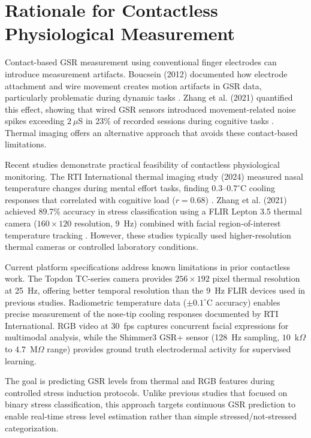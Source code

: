 \documentclass{report}
\begin{document}
    \section{Rationale for Contactless Physiological Measurement}
    \label{sec:rationale_contactless}

    Contact-based GSR measurement using conventional finger electrodes can introduce measurement artifacts. Boucsein (2012) documented how electrode attachment and wire movement creates motion artifacts in GSR data, particularly problematic during dynamic tasks \cite{boucsein2012}. Zhang et al. (2021) quantified this effect, showing that wired GSR sensors introduced movement-related noise spikes exceeding $2~\mu$S in 23\% of recorded sessions during cognitive tasks \cite{zhang2021}. Thermal imaging offers an alternative approach that avoids these contact-based limitations.

    Recent studies demonstrate practical feasibility of contactless physiological monitoring. The RTI International thermal imaging study (2024) measured nasal temperature changes during mental effort tasks, finding $0.3$--$0.7^{\circ}$C cooling responses that correlated with cognitive load ($r = 0.68$) \cite{rti2024}. Zhang et al. (2021) achieved 89.7\% accuracy in stress classification using a FLIR Lepton 3.5 thermal camera ($160 \times 120$ resolution, 9~Hz) combined with facial region-of-interest temperature tracking \cite{zhang2021}. However, these studies typically used higher-resolution thermal cameras or controlled laboratory conditions.

    Current platform specifications address known limitations in prior contactless work. The Topdon TC-series camera provides $256 \times 192$ pixel thermal resolution at 25~Hz, offering better temporal resolution than the 9~Hz FLIR devices used in previous studies. Radiometric temperature data ($\pm 0.1^{\circ}$C accuracy) enables precise measurement of the nose-tip cooling responses documented by RTI International. RGB video at 30~fps captures concurrent facial expressions for multimodal analysis, while the Shimmer3 GSR+ sensor (128~Hz sampling, $10$~k$\Omega$ to $4.7$~M$\Omega$ range) provides ground truth electrodermal activity for supervised learning.

    The goal is predicting GSR levels from thermal and RGB features during controlled stress induction protocols. Unlike previous studies that focused on binary stress classification, this approach targets continuous GSR prediction to enable real-time stress level estimation rather than simple stressed/not-stressed categorization.
\end{document}
